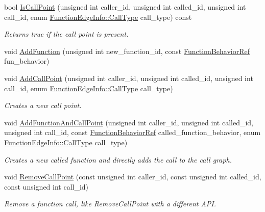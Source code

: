 \begin{DoxyCompactItemize}
bool \hyperlink{classCallGraphManager_a3b5428b1a496b3533bc41d9d419c5688}{Is\+Call\+Point} (unsigned int caller\+\_\+id, unsigned int called\+\_\+id, unsigned int call\+\_\+id, enum \hyperlink{structFunctionEdgeInfo_a39413ce8498ca68ed43c3f171f2607ef}{Function\+Edge\+Info\+::\+Call\+Type} call\+\_\+type) const
\begin{DoxyCompactList}\small\item\em Returns true if the call point is present. \end{DoxyCompactList}\item 
void \hyperlink{classCallGraphManager_aa0485c1d4e04aebcb51bcc9a594e1822}{Add\+Function} (unsigned int new\+\_\+function\+\_\+id, const \hyperlink{function__behavior_8hpp_affbc6a46ab86ddfabe31c10986d333dc}{Function\+Behavior\+Ref} fun\+\_\+behavior)
\item 
void \hyperlink{classCallGraphManager_ab0a2e36673ed04042f4cd69a18e5ca77}{Add\+Call\+Point} (unsigned int caller\+\_\+id, unsigned int called\+\_\+id, unsigned int call\+\_\+id, enum \hyperlink{structFunctionEdgeInfo_a39413ce8498ca68ed43c3f171f2607ef}{Function\+Edge\+Info\+::\+Call\+Type} call\+\_\+type)
\begin{DoxyCompactList}\small\item\em Creates a new call point. \end{DoxyCompactList}\item 
void \hyperlink{classCallGraphManager_ae1a2605dc9eb6b7259205aff1289b224}{Add\+Function\+And\+Call\+Point} (unsigned int caller\+\_\+id, unsigned int called\+\_\+id, unsigned int call\+\_\+id, const \hyperlink{function__behavior_8hpp_affbc6a46ab86ddfabe31c10986d333dc}{Function\+Behavior\+Ref} called\+\_\+function\+\_\+behavior, enum \hyperlink{structFunctionEdgeInfo_a39413ce8498ca68ed43c3f171f2607ef}{Function\+Edge\+Info\+::\+Call\+Type} call\+\_\+type)
\begin{DoxyCompactList}\small\item\em Creates a new called function and directly adds the call to the call graph. \end{DoxyCompactList}\item 
void \hyperlink{classCallGraphManager_a3e4d382c876899b61f2033f68d53159c}{Remove\+Call\+Point} (const unsigned int caller\+\_\+id, const unsigned int called\+\_\+id, const unsigned int call\+\_\+id)
\begin{DoxyCompactList}\small\item\em Remove a function call, like Remove\+Call\+Point with a different A\+PI. \end{DoxyCompactList}\item 

\end{DoxyCompactItemize}
